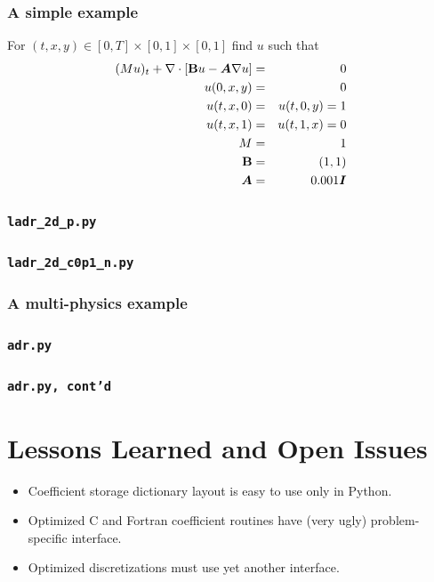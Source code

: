\documentclass{beamer}
\begin{document}
\begin{frame}
\frametitle{A simple example} For $(t,x,y) \in [0,T] \times [0,1]
\times [0,1]$ find $u$ such that
\begin{eqnarray*}
(Mu)_t + \nabla \cdot \left[ {\bf B} u- \mbox{{\boldmath ${A}$}} \nabla u \right]&=& 0 \\ u(0,x,y)
  &=& 0 \\ u(t,x,0) &=& u(t,0,y) = 1 \\ u(t,x,1) &=& u(t,1,x) = 0
  \\ M&=&1\\ {\bf B}&=&(1,1)\\ \mbox{{\boldmath ${A}$}}&=&0.001 \mbox{{\boldmath ${I}$}}
\end{eqnarray*}
\end{frame}

\begin{frame}
\frametitle{\texttt{ladr\_2d\_p.py}} \small

\end{frame}

\begin{frame}
\frametitle{\texttt{ladr\_2d\_c0p1\_n.py}}
\small

\end{frame}

\begin{frame}
\frametitle{A multi-physics example}
\small

\end{frame}

\begin{frame}
\frametitle{\texttt{adr.py}}
\small

\end{frame}

\begin{frame}
\frametitle{\texttt{adr.py, cont'd}}
\small

\end{frame}

\section{Lessons Learned and Open Issues}

\begin{frame}
\begin{itemize}
\item Coefficient storage dictionary layout is easy to use only in
  Python.
\item Optimized C and Fortran coefficient routines have (very ugly)
  problem-specific interface.
\item Optimized discretizations must use yet another interface.
\end{itemize}
\end{frame}
\end{document}
